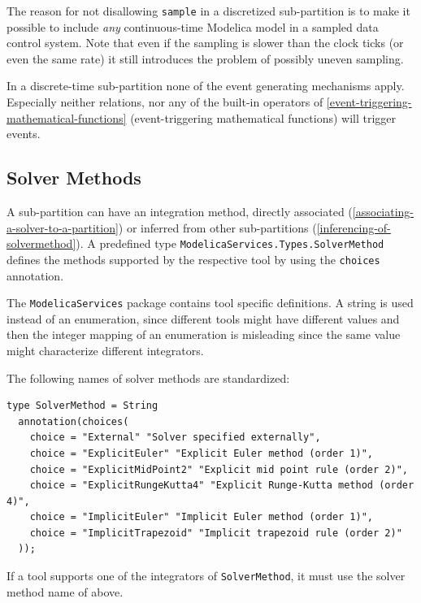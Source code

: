 \begin{nonnormative}
The reason for not disallowing \lstinline!sample! in a discretized sub-partition is to make it possible to include \emph{any} continuous-time Modelica model in a sampled data control system.
Note that even if the sampling is slower than the clock ticks (or even the same rate) it still introduces the problem of possibly uneven sampling.
\end{nonnormative}

In a discrete-time sub-partition none of the event generating mechanisms apply.
Especially neither relations, nor any of the built-in operators of \cref{event-triggering-mathematical-functions} (event-triggering mathematical functions) will trigger events.

\subsection{Solver Methods}\label{solver-methods}

A sub-partition can have an integration method, directly associated (\cref{associating-a-solver-to-a-partition}) or inferred from other sub-partitions (\cref{inferencing-of-solvermethod}).
A predefined type \lstinline!ModelicaServices.Types.SolverMethod! defines the methods supported by the respective tool by using the \lstinline!choices! annotation.

\begin{nonnormative}
The \lstinline!ModelicaServices! package contains tool specific definitions.
A string is used instead of an enumeration, since different tools might have different values and then the integer mapping of an enumeration is misleading since the same value might characterize different integrators.
\end{nonnormative}

The following names of solver methods are standardized:
\begin{lstlisting}[language=modelica]
type SolverMethod = String
  annotation(choices(
    choice = "External" "Solver specified externally",
    choice = "ExplicitEuler" "Explicit Euler method (order 1)",
    choice = "ExplicitMidPoint2" "Explicit mid point rule (order 2)",
    choice = "ExplicitRungeKutta4" "Explicit Runge-Kutta method (order 4)",
    choice = "ImplicitEuler" "Implicit Euler method (order 1)",
    choice = "ImplicitTrapezoid" "Implicit trapezoid rule (order 2)"
  ));
\end{lstlisting}

If a tool supports one of the integrators of \lstinline!SolverMethod!, it must use the solver method name of above.

